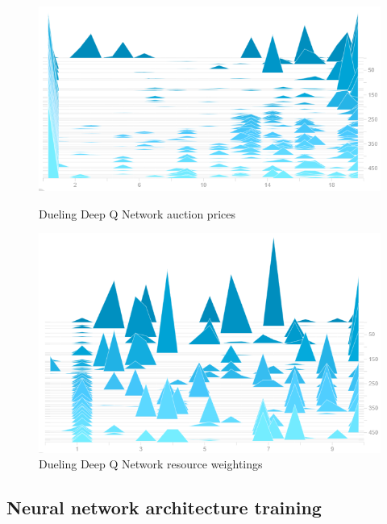 \begin{figure}[h]
    \centering
    \begin{minipage}{0.5\textwidth}
        \centering
        \includegraphics[width=1.0\textwidth]{figures/algo_training_fig/dueling_dqn_auction_prices.png}
        \caption{Dueling Deep Q Network auction prices}
        \label{fig:dueling-dqn-auction-prices}
    \end{minipage}\hfill
    \begin{minipage}{0.5\textwidth}
        \centering
        \includegraphics[width=1.0\textwidth]{figures/algo_training_fig/dueling_dqn_weightings.png}
        \caption{Dueling Deep Q Network resource weightings}
        \label{fig:dueling-dqn-resource-weightings}
    \end{minipage}
\end{figure}

\subsection{Neural network architecture training}\label{subsec:neural-network-architecture-training}

